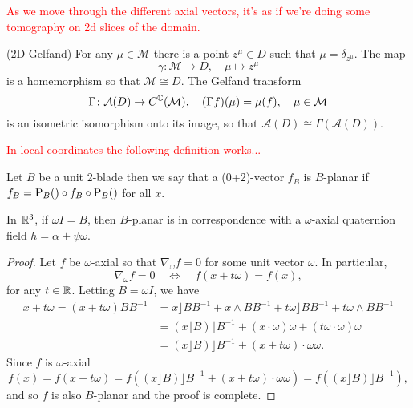 

\textcolor{red}{As we move through the different axial vectors, it's as if we're doing some tomography on 2d slices of the domain.}



\begin{theorem}
(2D Gelfand) For any $\mu \in \mathcal{M}$ there is a point $z^\mu \in D$ such that $\mu = \delta_{z^\mu}$. The map
\[
\gamma \colon \mathcal{M} \to D, \quad \mu \mapsto z^\mu
\]
is a homemorphism so that $\mathcal{M} \cong D$. The Gelfand transform
\[
\Gamma \colon \mathcal{A}(D) \to C^{\mathbb{C}} (\mathcal{M}), \quad (\Gamma f)(\mu) = \mu(f), \quad \mu \in \mathcal{M}
\]
is an isometric isomorphism onto its image, so that $\mathcal{A}(D)\cong \Gamma(\mathcal{A}(D))$.
\end{theorem}


\textcolor{red}{In local coordinates the following definition works...}

\begin{definition}
    Let $B$ be a unit 2-blade then we say that a (0+2)-vector $f_B$ is $B$-planar if $f_B = \operatorname{P}_{B}() \circ f_B \circ \operatorname{P}_{B}()$ for all $x$.
\end{definition} 


\begin{proposition}
    In $\mathbb{R}^3$, if $\omega I = B$, then $B$-planar is in correspondence with a $\omega$-axial quaternion field $h = \alpha + \psi \omega$. 
\end{proposition}
\begin{proof}
    Let $f$ be $\omega$-axial so that $\nabla_\omega f =0$ for some unit vector $\omega$. In particular,
    \[
        \nabla_\omega f = 0 \quad \iff \quad f(x + t\omega) = f(x),
    \]
    for any $t\in \mathbb{R}$. Letting $B=\omega I$, we have
    \begin{align*}
        x+t\omega=(x+t\omega)BB^{-1}&=x\rfloor B B^{-1} + x\wedge BB^{-1} + t\omega \rfloor BB^{-1} + t\omega \wedge B B^{-1}\\
        &= (x\rfloor B) \rfloor B^{-1} + (x\cdot \omega)\omega + (t\omega \cdot \omega)\omega\\
        &= (x\rfloor B)\rfloor B^{-1} + 
(x+t\omega)\cdot \omega \omega.
    \end{align*}
    Since $f$ is $\omega$-axial
    \[
        f(x)=f(x+t\omega)=f((x\rfloor B)\rfloor B^{-1} + (x+t\omega)\cdot \omega \omega)=f((x\rfloor B)\rfloor B^{-1}),
    \]
    and so $f$ is also $B$-planar and the proof is complete.
\end{proof}

